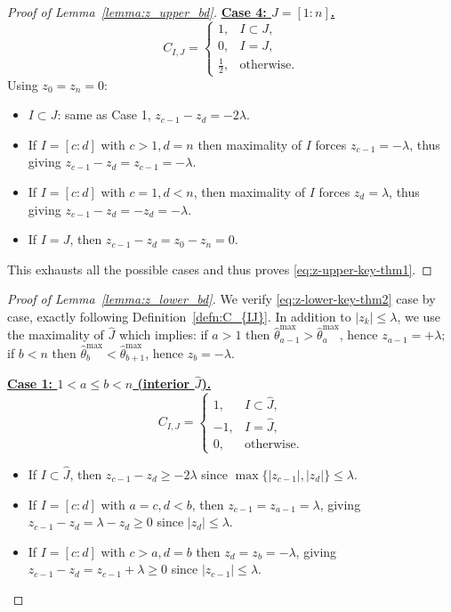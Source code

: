 \documentclass[11pt]{article}
\theoremstyle{plain}
\theoremstyle{definition}
\theoremstyle{remark}
\begin{document}
\begin{appendix}
\begin{proof}[Proof of Lemma~\ref{lemma:z_upper_bd}]
\medskip
\noindent\underline{\textbf{Case 4: $J=[1:n]$.}}
\[
C_{I,J}=
\begin{cases}
1, & I\subset J,\\
0, & I=J,\\
\tfrac12, & \text{otherwise}.
\end{cases}
\]
Using $z_0=z_n=0$:
\begin{itemize}
\item $I\subset J$: same as Case 1, $z_{c-1}-z_d=-2\lambda$.
\item If $I=[c:d]$ with $c > 1, d = n$ then maximality of $I$ forces $z_{c-1}=-\lambda$, thus giving $z_{c-1}-z_d = z_{c-1} = -\lambda.$
\item If $I=[c:d]$ with $c = 1,d < n$, then maximality of $I$ forces $z_d=\lambda$, thus giving $z_{c-1}- z_d = -z_d = -\lambda.$
\item If $I=J$, then $z_{c-1}-z_d  = z_0 - z_n = 0.$
\end{itemize}

This exhausts all the possible cases and thus proves \eqref{eq:z-upper-key-thm1}. 
\end{proof}

\begin{proof} [Proof of Lemma~\ref{lemma:z_lower_bd}]
    We verify \eqref{eq:z-lower-key-thm2} case by case, exactly following Definition~\ref{defn:C_{IJ}}.
In addition to $|z_k|\le\lambda$, we use the maximality of $\hat{J}$ which implies:
if $a>1$ then $\hat\theta^{\max}_{a-1}>\hat\theta^{\max}_a$, hence $z_{a-1}=+\lambda$;
if $b<n$ then $\hat\theta^{\max}_{b}<\hat\theta^{\max}_{b+1}$, hence $z_b=-\lambda$.

\medskip
\noindent\underline{\textbf{Case 1: $1<a\le b<n$ (interior $\hat{J}$).}}
\[
C_{I,J}=
\begin{cases}
1, & I\subset \hat{J},\\
-1, & I=\hat{J},\\
0, & \text{otherwise}.
\end{cases}
\]
\begin{itemize}
\item If $I\subset \hat{J}$, then $z_{c-1}-z_d \geq -2\lambda$ since $\max\{|z_{c - 1}|,|z_{d}|\} \leq \lambda.$

\item If $I=[c:d]$ with $a = c, d < b$, then $z_{c - 1} = z_{a-1}=\lambda$, giving $z_{c-1}- z_d = \lambda - z_d \ge 0$ since $|z_{d}| \leq \lambda.$

\item If $I=[c:d]$ with $c > a, d = b$ then $z_{d} = z_b=-\lambda$, giving $z_{c-1}-z_d = z_{c-1}+\lambda \ge 0$ since $|z_{c - 1}| \leq \lambda.$


\end{itemize}
\end{proof}
\end{appendix}
\end{document}
